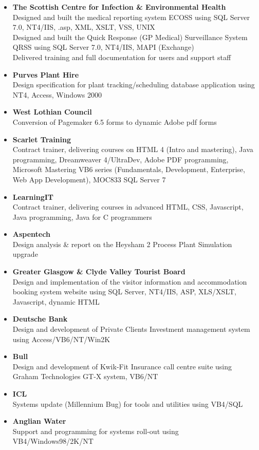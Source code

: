 \documentclass[10pt]{article}
\newenvironment{outerlist}[1][\enskip\textbullet]%
        {\begin{itemize}[#1]}{\end{itemize}%
         \vspace{-.6\baselineskip}}
\begin{document}
\begin{outerlist}
\begin{outerlist}
\item \textbf{The Scottish Centre for Infection \& Environmental Health} \\ %
		Designed and built the medical reporting system ECOSS using SQL Server 7.0, NT4/IIS, .asp, XML, XSLT, VSS, UNIX\\
		Designed and built the Quick Response (GP Medical) Surveillance System QRSS using SQL Server 7.0, NT4/IIS, MAPI (Exchange)\\
		Delivered training and full documentation for users and support staff
\item \textbf{Purves Plant Hire} \\ %
	Design specification for plant tracking/scheduling database application using NT4, Access, Windows 2000
\item \textbf{West Lothian Council}\\ %
	Conversion of Pagemaker 6.5 forms to dynamic Adobe pdf forms 
\item \textbf{Scarlet Training} \\%
	Contract trainer, delivering courses on HTML 4 (Intro and mastering), Java programming, Dreamweaver 4/UltraDev, Adobe PDF programming, Microsoft Mastering VB6 series (Fundamentals, Development, Enterprise, Web App Development), MOC833 SQL Server 7
\item \textbf{LearningIT} \\ %
	Contract trainer, delivering courses in advanced HTML, CSS, Javascript, Java programming, Java for C programmers
\item \textbf{Aspentech} \\ %
	Design analysis \& report on the Heysham 2 Process Plant Simulation upgrade
\item \textbf{Greater Glasgow \& Clyde Valley Tourist Board} \\ %
	Design and implementation of the visitor information and accommodation booking system website using SQL Server, NT4/IIS, ASP, XLS/XSLT, Javascript, dynamic HTML
\item \textbf{Deutsche Bank} \\ %
	Design and development of Private Clients Investment management system using Access/VB6/NT/Win2K
\item \textbf{Bull} \\ %
	Design and development of Kwik-Fit Insurance call centre suite using Graham Technologies GT-X system, VB6/NT
\item \textbf{ICL} \\ %
	Systems update (Millennium Bug) for tools and utilities using VB4/SQL
\item \textbf{Anglian Water} \\ %
	Support and programming for systems roll-out using VB4/Windows98/2K/NT

\end{outerlist}
\end{outerlist}
\end{document}
